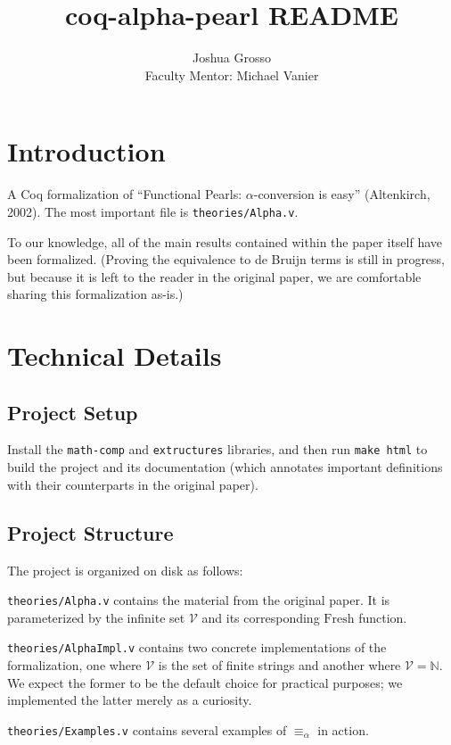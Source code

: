 \documentclass{article}
\title{coq-alpha-pearl README}
\author{Joshua Grosso \\ Faculty Mentor: Michael Vanier}
\begin{document}
\maketitle

\section{Introduction}

A Coq formalization of ``Functional Pearls: $\alpha$-conversion is easy'' (Altenkirch, 2002). The most important file is \verb|theories/Alpha.v|.

To our knowledge, all of the main results contained within the paper itself have been formalized. (Proving the equivalence to de Bruijn terms is still in progress, but because it is left to the reader in the original paper, we are comfortable sharing this formalization as-is.)

\section{Technical Details}

\subsection{Project Setup}

Install the \verb|math-comp| and \verb|extructures| libraries, and then run \verb|make html| to
build the project and its documentation (which annotates important definitions with their
counterparts in the original paper).

\subsection{Project Structure}

The project is organized on disk as follows:

\verb|theories/Alpha.v| contains the material from the original paper. It is parameterized by the infinite set $\mathcal{V}$ and its corresponding $\textrm{Fresh}$ function.

\verb|theories/AlphaImpl.v| contains two concrete implementations of the formalization, one where
$\mathcal{V}$ is the set of finite strings and another where $\mathcal{V} = \mathbb{N}$. We expect
the former to be the default choice for practical purposes; we implemented the latter merely as a
curiosity.

\verb|theories/Examples.v| contains several examples of $\equiv_\alpha$ in action.
\end{document}
